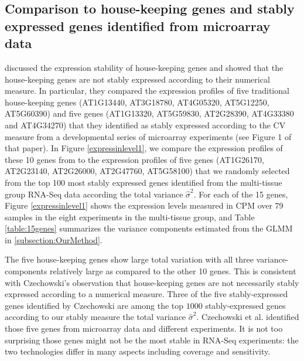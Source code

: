 \documentclass[11pt, a4paper]{article}
\begin{document}
\subsection{Comparison to house-keeping genes and stably expressed genes
identified from microarray data}\label{section:CompareStablyExpressedGene}
\cite{czechowski2005genome} discussed the expression stability of
house-keeping genes and showed that the house-keeping genes are not stably
expressed according to their numerical measure. In particular, they compared
the expression profiles of five traditional house-keeping genes (AT1G13440,
AT3G18780, AT4G05320, AT5G12250, AT5G60390) and five genes (AT1G13320,
AT5G59830, AT2G28390, AT4G33380 and AT4G34270) that they identified  as stably
expressed according to the CV measure from a developmental series of
microarray experiments (see Figure 1 of that paper).  
In Figure \ref{expressinlevel1}, we compare the expression profiles 
of these 10 genes from \cite{czechowski2005genome} to the expression profiles
of five genes (AT1G26170, AT2G23140, AT2G26000, AT2G47760, AT5G58100) that we
randomly selected from the top 100 most stably expressed genes identified from
the multi-tissue group RNA-Seq data according the total variance $\hat\sigma^2$.
For each of the 15 genes, Figure \ref{expressinlevel1} shows the expression levels measured
in CPM over 79 samples in the eight experiments in the multi-tissue group,
and Table \ref{table:15genes} summarizes the variance components estimated from the
GLMM in \ref{subsection:OurMethod}. 

The five house-keeping genes show large total variation with all three
variance-components relatively large as compared to the other 10 genes. This is
consistent with Czechowski's observation that house-keeping genes are not necessarily stably
expressed according to a numerical measure. Three of the five
stably-expressed genes identified by Czechowski are among the top $1000$
stably-expressed genes according to our stably measure the total variance $\hat\sigma^2$. Czechowski et al.
identified those five genes from microarray data and different experiments. It
is not too surprising those genes might not be the most stable in RNA-Seq
experiments: the two technologies differ in many aspects including coverage
and sensitivity. 
\end{document}

